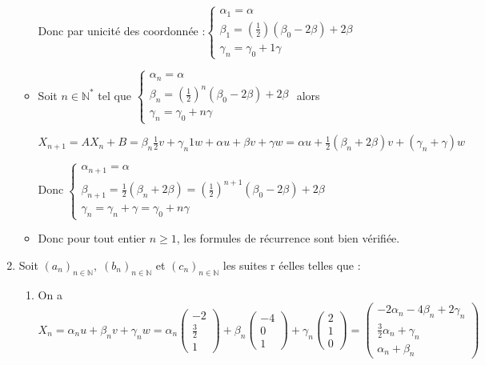 \documentclass[a4paper, 11pt,reqno]{article}
\begin{document}
\begin{enumerate}
\begin{itemize}
Donc par unicit\'{e} des coordonn\'{e}e :$\left\{ 
\begin{array}{l}
\alpha _{1}=\alpha \\ 
\beta _{1}=\left( \frac{1}{2}\right) \left( \beta _{0}-2\beta \right) +2\beta
\\ 
\gamma _{n}=\gamma _{0}+1\gamma%
\end{array}
\right. $

\item Soit $n\in \mathbb{N}^{*}$ tel que $\left\{ 
\begin{array}{l}
\alpha _{n}=\alpha \\ 
\beta _{n}=\left( \frac{1}{2}\right) ^{n}\left( \beta _{0}-2\beta \right)
+2\beta \\ 
\gamma _{n}=\gamma _{0}+n\gamma%
\end{array}
\right. $ alors

$X_{n+1}=AX_{n}+B=\beta _{n}\frac{1}{2}v+\gamma _{n}1w+\alpha u+\beta
v+\gamma w=\alpha u+\frac{1}{2}\left( \beta _{n}+2\beta \right) v+\left(
\gamma _{n}+\gamma \right) w$

Donc$\;\left\{ 
\begin{array}{l}
\alpha _{n+1}=\alpha \\ 
\beta _{n+1}=\frac{1}{2}\left( \beta _{n}+2\beta \right) =\left( \frac{1}{2}%
\right) ^{n+1}\left( \beta _{0}-2\beta \right) +2\beta \\ 
\gamma _{n}=\gamma _{n}+\gamma =\gamma _{0}+n\gamma%
\end{array}
\right. $

\item Donc pour tout entier $n\ge 1$, les formules de r\'{e}currence sont
bien v\'{e}rifi\'{e}e.
\end{itemize}

\item Soit $\left( a_{n}\right) _{n\in \mathbb{N}},\;\left( b_{n}\right)
_{n\in \mathbb{N}}$ et $\left( c_{n}\right) _{n\in \mathbb{N}}$ les suites r%
\'{e}elles telles que :

\begin{enumerate}
\item On a $X_{n}=\alpha _{n}u+\beta _{n}v+\gamma _{n}w=\alpha _{n}\left( 
\begin{array}{c}
-2 \\ 
\frac{3}{2} \\ 
1%
\end{array}
\right) +\beta _{n}\left( 
\begin{array}{c}
-4 \\ 
0 \\ 
1%
\end{array}
\right) +\gamma _{n}\left( 
\begin{array}{c}
2 \\ 
1 \\ 
0%
\end{array}
\right) =\allowbreak \left( 
\begin{array}{c}
-2\alpha _{n}-4\beta _{n}+2\gamma _{n} \\ 
\frac{3}{2}\alpha _{n}+\gamma _{n} \\ 
\alpha _{n}+\beta _{n}%
\end{array}
\right) $


\end{enumerate}
\end{enumerate}
\end{document}
